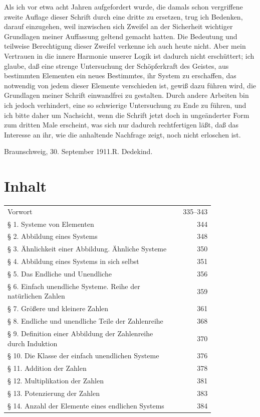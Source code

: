 \documentclass[11pt]{article}
\begin{document}
Als ich vor etwa acht Jahren aufgefordert wurde, die damals schon vergriffene zweite Auflage dieser Schrift durch eine dritte zu ersetzen, trug ich Bedenken, darauf einzugehen, weil inzwischen sich Zweifel an der Sicherheit wichtiger Grundlagen meiner Auffassung geltend gemacht hatten. Die Bedeutung und teilweise Berechtigung dieser Zweifel verkenne ich auch heute nicht. Aber mein Vertrauen in die innere Harmonie unserer Logik ist dadurch nicht erschüttert; ich glaube, daß eine strenge Untersuchung der Schöpferkraft des Geistes, aus bestimmten Elementen ein neues Bestimmtes, ihr System zu erschaffen, das notwendig von jedem dieser Elemente verschieden ist, gewiß dazu führen wird, die Grundlagen meiner Schrift einwandfrei zu gestalten. Durch andere Arbeiten bin ich jedoch verhindert, eine so schwierige Untersuchung zu Ende zu führen, und ich bitte daher um Nachsicht, wenn die Schrift jetzt doch in ungeänderter Form zum dritten Male erscheint, was sich nur dadurch rechtfertigen läßt, daß das Interesse an ihr, wie die anhaltende Nachfrage zeigt, noch nicht erloschen ist.

\begin{flushright}Braunschweig, 30. September 1911.\qquad R. Dedekind.\end{flushright}

\section*{Inhalt}
\begin{tabular}{@{}p{0.82\linewidth}r@{}}
Vorwort & 335--343\\
§ 1. Systeme von Elementen & 344\\
§ 2. Abbildung eines Systems & 348\\
§ 3. Ähnlichkeit einer Abbildung. Ähnliche Systeme & 350\\
§ 4. Abbildung eines Systems in sich selbst & 351\\
§ 5. Das Endliche und Unendliche & 356\\
§ 6. Einfach unendliche Systeme. Reihe der natürlichen Zahlen & 359\\
§ 7. Größere und kleinere Zahlen & 361\\
§ 8. Endliche und unendliche Teile der Zahlenreihe & 368\\
§ 9. Definition einer Abbildung der Zahlenreihe durch Induktion & 370\\
§ 10. Die Klasse der einfach unendlichen Systeme & 376\\
§ 11. Addition der Zahlen & 378\\
§ 12. Multiplikation der Zahlen & 381\\
§ 13. Potenzierung der Zahlen & 383\\
§ 14. Anzahl der Elemente eines endlichen Systems & 384
\end{tabular}
\end{document}
